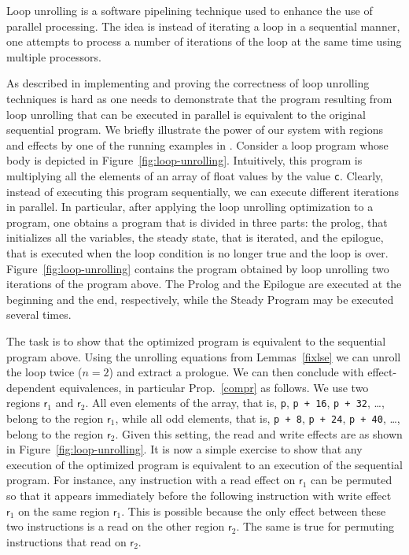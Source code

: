 \documentclass[orivec]{llncs}
\makeatletter
\renewcommand\subsection{\@startsection{subsection}{2}{\z@}{-2\p@ \@plus -4\p@ \@minus -4\p@}{-0.5em \@plus -0.22em \@minus -0.1em}{\normalfont\normalsize\bfseries}}
\newcommand{\regid}{\ensuremath{\mathsf{r}}}
\makeatother
\begin{document}
\subsection{Loop Unrolling}
Loop unrolling is a software pipelining technique used to enhance the use
of parallel processing. The idea is instead of iterating a loop 
in a sequential manner, one attempts to process a number of iterations
of the loop at the same time using multiple processors.

As described in \cite{tristan10popl} implementing and proving the
correctness of loop unrolling techniques is hard as
one needs to demonstrate that the program resulting from loop unrolling
that can be executed in parallel is equivalent to the original sequential
program. We briefly illustrate the power of our system with regions and
effects by one of the running examples in \cite{tristan10popl}. Consider
a loop program whose body is depicted in Figure~\ref{fig:loop-unrolling}.
Intuitively, this program is multiplying all the elements of an array of 
float values by the value \texttt{c}. Clearly, instead of executing this
program sequentially, we can execute different iterations in parallel. 
In particular, after applying the loop unrolling optimization to a program,
one obtains a program that is divided in three parts: the prolog, that
initializes all the variables, the steady state, that is iterated, and the
epilogue, that is executed when the loop condition is no longer true and
the loop is over. Figure~\ref{fig:loop-unrolling} contains the program
obtained by loop unrolling two iterations of the program above. The Prolog
and the Epilogue are executed at the beginning and the end, respectively,
while the Steady Program may be executed several times. 

The task is to show that the optimized program is equivalent to the
sequential program above. Using the unrolling equations from
Lemmas~\ref{fixlse} we can unroll the loop twice
($n=2$) and extract a prologue. We can then conclude with
effect-dependent equivalences, in particular Prop.~\ref{compr} as
follows. We use two regions $\regid_1$
and $\regid_2$. All even elements of the array, that is, \texttt{p},
\texttt{p + 16}, \texttt{p + 32}, \ldots, belong to the region $\regid_1$,
while all odd elements, that is, \texttt{p + 8},
\texttt{p + 24}, \texttt{p + 40}, \ldots, belong to the region $\regid_2$.
Given this setting, the read and write effects are as shown in
Figure~\ref{fig:loop-unrolling}. It is now a simple exercise to show that
any execution of the optimized program is equivalent to an execution of
the sequential program. For instance, any instruction with a read effect 
on $\regid_1$ can be permuted so that it appears immediately before the
following instruction with write effect $\regid_1$ on the same region
$\regid_1$. This is possible because the only effect between these two
instructions is a read on the other region $\regid_2$. The same is true
for permuting instructions that read on $\regid_2$. 
\end{document}
